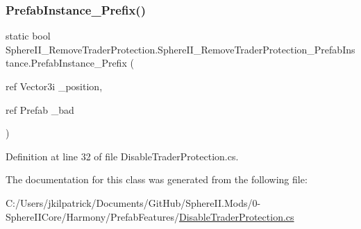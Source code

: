 \subsubsection{\texorpdfstring{PrefabInstance\_Prefix()}{PrefabInstance\_Prefix()}}
{\footnotesize\ttfamily static bool Sphere\+I\+I\+\_\+\+Remove\+Trader\+Protection.\+Sphere\+I\+I\+\_\+\+Remove\+Trader\+Protection\+\_\+\+Prefab\+Instance.\+Prefab\+Instance\+\_\+\+Prefix (\begin{DoxyParamCaption}\item[{ref Vector3i}]{\+\_\+position,  }\item[{ref Prefab}]{\+\_\+bad }\end{DoxyParamCaption})\hspace{0.3cm}{\ttfamily [static]}}



Definition at line 32 of file Disable\+Trader\+Protection.\+cs.



The documentation for this class was generated from the following file\+:\begin{DoxyCompactItemize}
\item 
C\+:/\+Users/jkilpatrick/\+Documents/\+Git\+Hub/\+Sphere\+I\+I.\+Mods/0-\/\+Sphere\+I\+I\+Core/\+Harmony/\+Prefab\+Features/\mbox{\hyperlink{_disable_trader_protection_8cs}{Disable\+Trader\+Protection.\+cs}}\end{DoxyCompactItemize}
